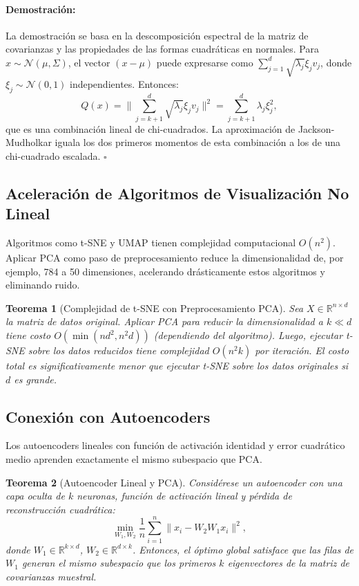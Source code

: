 \documentclass[11pt]{article}
\theoremstyle{plain}
\newtheorem{theorem}{Teorema}[section]
\newenvironment{proof}{\paragraph{Demostración:}}{\hfill$\square$}
\begin{document}
\begin{proof}
La demostración se basa en la descomposición espectral de la matriz de covarianzas y las propiedades de las formas cuadráticas en normales. Para $x \sim \mathcal{N}(\mu, \Sigma)$, el vector $(x - \mu)$ puede expresarse como $\sum_{j=1}^d \sqrt{\lambda_j} \xi_j v_j$, donde $\xi_j \sim \mathcal{N}(0,1)$ independientes. Entonces:
\[
Q(x) = \| \sum_{j=k+1}^d \sqrt{\lambda_j} \xi_j v_j \|^2 = \sum_{j=k+1}^d \lambda_j \xi_j^2,
\]
que es una combinación lineal de chi-cuadrados. La aproximación de Jackson-Mudholkar iguala los dos primeros momentos de esta combinación a los de una chi-cuadrado escalada.
\end{proof}

\subsection{Aceleración de Algoritmos de Visualización No Lineal}

Algoritmos como t-SNE y UMAP tienen complejidad computacional $O(n^2)$. Aplicar PCA como paso de preprocesamiento reduce la dimensionalidad de, por ejemplo, 784 a 50 dimensiones, acelerando drásticamente estos algoritmos y eliminando ruido.

\begin{theorem}[Complejidad de t-SNE con Preprocesamiento PCA]
Sea $X \in \mathbb{R}^{n \times d}$ la matriz de datos original. Aplicar PCA para reducir la dimensionalidad a $k \ll d$ tiene costo $O(\min(nd^2, n^2 d))$ (dependiendo del algoritmo). Luego, ejecutar t-SNE sobre los datos reducidos tiene complejidad $O(n^2 k)$ por iteración. El costo total es significativamente menor que ejecutar t-SNE sobre los datos originales si $d$ es grande.
\end{theorem}

\subsection{Conexión con Autoencoders}

Los autoencoders lineales con función de activación identidad y error cuadrático medio aprenden exactamente el mismo subespacio que PCA.

\begin{theorem}[Autoencoder Lineal y PCA]
\label{thm:ae_pca}
Considérese un autoencoder con una capa oculta de $k$ neuronas, función de activación lineal y pérdida de reconstrucción cuadrática:
\[
\min_{W_1, W_2} \frac{1}{n} \sum_{i=1}^n \|x_i - W_2 W_1 x_i\|^2,
\]
donde $W_1 \in \mathbb{R}^{k \times d}$, $W_2 \in \mathbb{R}^{d \times k}$. Entonces, el óptimo global satisface que las filas de $W_1$ generan el mismo subespacio que los primeros $k$ eigenvectores de la matriz de covarianzas muestral.
\end{theorem}
\end{document}

